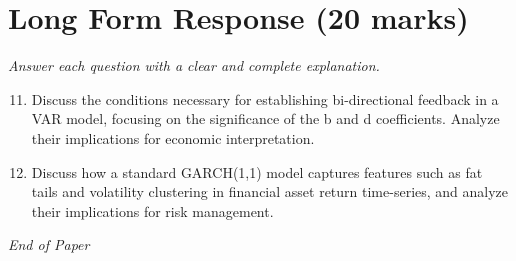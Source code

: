 \documentclass[12pt]{article}
\begin{document}
\section*{Long Form Response (20 marks)}
\textit{Answer each question with a clear and complete explanation.}
\begin{enumerate}[label=\arabic*.]
\setcounter{enumi}{10}
\item Discuss the conditions necessary for establishing bi-directional feedback in a VAR model,
focusing on the significance of the b and d coefficients. Analyze their implications for
economic interpretation.
\item Discuss how a standard GARCH(1,1) model captures features such as fat tails and volatility
clustering in financial asset return time-series, and analyze their implications for risk
management.
\end{enumerate}

\vfill
\noindent\textit{End of Paper}
\end{document}
